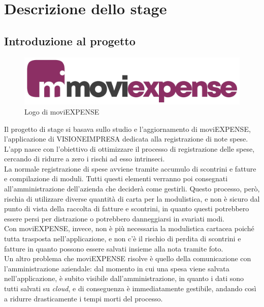 \chapter{Descrizione dello stage}
\label{cap:descrizione-stage}


\section{Introduzione al progetto}

\begin{figure}[!h]
    \centering 
    \includegraphics[width=0.5\columnwidth]{images/moviExpense_logo.png} 
    \caption{Logo di moviEXPENSE}
\end{figure}

Il progetto di stage si basava sullo studio e l'aggiornamento di moviEXPENSE, l'applicazione di VISIONEIMPRESA dedicata alla registrazione di note spese. L'app nasce con l'obiettivo di ottimizzare il processo di registrazione delle spese, cercando di ridurre a zero i rischi ad esso intrinseci.\\
La normale registrazione di spese avviene tramite accumulo di scontrini e fatture e compilazione di moduli. Tutti questi elementi verranno poi consegnati all'amministrazione dell'azienda che deciderà come gestirli. Questo processo, però, rischia di utilizzare diverse quantità di carta per la modulistica, e non è sicuro dal punto di vista della raccolta di fatture e scontrini, in quanto questi potrebbero essere persi per distrazione o potrebbero danneggiarsi in svariati modi.\\
Con moviEXPENSE, invece, non è più necessaria la modulistica cartacea poiché tutta trasposta nell'applicazione, e non c'è il rischio di perdita di scontrini e fatture in quanto possono essere salvati insieme alla nota tramite foto.\\
Un altro problema che moviEXPENSE risolve è quello della comunicazione con l'amministrazione aziendale: dal momento in cui una spesa viene salvata nell'applicazione, è subito visibile dall'amministrazione, in quanto i dati sono tutti salvati su \emph{\gls{cloud}}\glsfirstoccur, e di conseguenza è immediatamente gestibile, andando così a ridurre drasticamente i tempi morti del processo.

